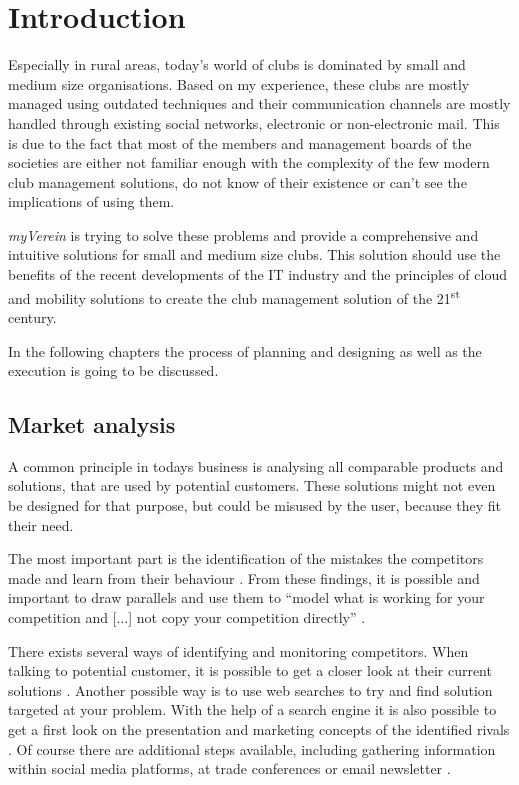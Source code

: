 \pagestyle{fancy}
\lhead{}
\renewcommand{\headrulewidth}{0pt}
\setlength{\headheight}{14pt}

\chapter{Introduction}
\label{chapter:Intro}

Especially in rural areas, today's world of clubs is dominated by small and medium size organisations. Based on my experience, these clubs are mostly managed using outdated techniques and their communication channels are mostly handled through existing social networks, electronic or non-electronic mail. This is due to the fact that most of the members and management boards of the societies are either not familiar enough with the complexity of the few modern club management solutions, do not know of their existence or can't see the implications of using them.

\emph{myVerein} is trying to solve these problems and provide a comprehensive and intuitive solutions for small and medium size clubs. This solution should use the benefits of the recent developments of the IT industry and the principles of cloud and mobility solutions to create the club management solution of the 21\textsuperscript{st} century. 

In the following chapters the process of planning and designing as well as the execution is going to be discussed. 

\section{Market analysis}
\label{sec:MarketAnalysis}

A common principle in todays business is analysing all comparable products and solutions, that are used by potential customers. These solutions might not even be designed for that purpose, but could be misused by the user, because they fit their need.

The most important part is the identification of the mistakes the competitors made and learn from their behaviour \cite{Hunter:2015aa}. From these findings, it is possible and important to draw parallels and use them to \enquote{model what is working for your competition and [...] not copy your competition directly} \cite{Hunter:2015aa}. 

There exists several ways of identifying and monitoring competitors. When talking to potential customer, it is possible to get a closer look at their current solutions \cite{Philips:2015aa}. Another possible way is to use web searches to try and find solution targeted at your problem. With the help of a search engine it is also possible to get a first look on the presentation and marketing concepts of the identified rivals \cite{Philips:2015aa}. Of course there are additional steps available, including gathering information within social media platforms, at trade conferences or email newsletter \cite{Dahl:2011aa}. 


